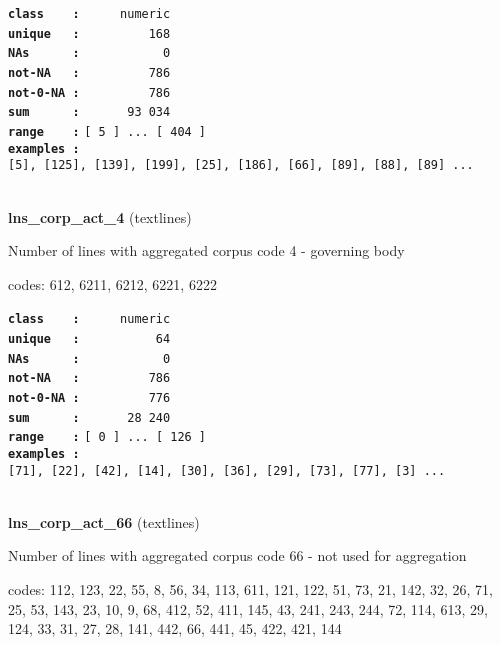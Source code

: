 \documentclass[]{article}
\begin{document}
\textbf{\texttt{class\ \ \ \ :}} \texttt{~~~~~numeric}\\
\textbf{\texttt{unique\ \ \ :}} \texttt{~~~~~~~~~168}\\
\textbf{\texttt{NAs\ \ \ \ \ \ :}} \texttt{~~~~~~~~~~~0}\\
\textbf{\texttt{not-NA\ \ \ :}} \texttt{~~~~~~~~~786}\\
\textbf{\texttt{not-0-NA\ :}} \texttt{~~~~~~~~~786}\\
\textbf{\texttt{sum\ \ \ \ \ \ :}} \texttt{~~~~~~93~034}\\
\textbf{\texttt{range\ \ \ \ :}}
\texttt{{[}\ 5\ {]}\ ...\ {[}\ 404\ {]}}\\
\textbf{\texttt{examples\ :}}
\texttt{{[}5{]},\ {[}125{]},\ {[}139{]},\ {[}199{]},\ {[}25{]},\ {[}186{]},\ {[}66{]},\ {[}89{]},\ {[}88{]},\ {[}89{]}\ ...}\\

~

\textbf{lns\_corp\_act\_4} (textlines)

Number of lines with aggregated corpus code 4 - governing body

codes: 612, 6211, 6212, 6221, 6222

\textbf{\texttt{class\ \ \ \ :}} \texttt{~~~~~numeric}\\
\textbf{\texttt{unique\ \ \ :}} \texttt{~~~~~~~~~~64}\\
\textbf{\texttt{NAs\ \ \ \ \ \ :}} \texttt{~~~~~~~~~~~0}\\
\textbf{\texttt{not-NA\ \ \ :}} \texttt{~~~~~~~~~786}\\
\textbf{\texttt{not-0-NA\ :}} \texttt{~~~~~~~~~776}\\
\textbf{\texttt{sum\ \ \ \ \ \ :}} \texttt{~~~~~~28~240}\\
\textbf{\texttt{range\ \ \ \ :}}
\texttt{{[}\ 0\ {]}\ ...\ {[}\ 126\ {]}}\\
\textbf{\texttt{examples\ :}}
\texttt{{[}71{]},\ {[}22{]},\ {[}42{]},\ {[}14{]},\ {[}30{]},\ {[}36{]},\ {[}29{]},\ {[}73{]},\ {[}77{]},\ {[}3{]}\ ...}\\

~

\textbf{lns\_corp\_act\_66} (textlines)

Number of lines with aggregated corpus code 66 - not used for
aggregation

codes: 112, 123, 22, 55, 8, 56, 34, 113, 611, 121, 122, 51, 73, 21, 142,
32, 26, 71, 25, 53, 143, 23, 10, 9, 68, 412, 52, 411, 145, 43, 241, 243,
244, 72, 114, 613, 29, 124, 33, 31, 27, 28, 141, 442, 66, 441, 45, 422,
421, 144
\end{document}
